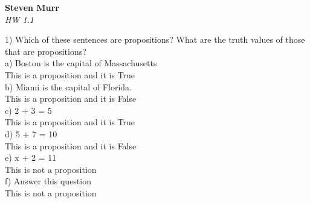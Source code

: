 \documentclass{article}
\begin{document}
   \begin{flushright}
      \Large\textbf{Steven Murr}\\
      \large\textit{HW 1.1}
   \end{flushright}
\begin{flushleft}
1) Which of these sentences are propositions? What are the truth values of those that are propositions?\newline
\\\setlength\parindent{24pt}a) Boston is the capital of Massachusetts \\
\setlength\parindent{48pt} This is a proposition and it is True \\
\setlength\parindent{0pt}
\setlength\parindent{24pt}b) Miami is the capital of Florida. \\
\setlength\parindent{48pt} This is a proposition and it is False \\
\setlength\parindent{0pt} 
\setlength\parindent{24pt}c) 2 + 3 = 5 \\
\setlength\parindent{48pt} This is a proposition and it is True \\
\setlength\parindent{0pt}
\setlength\parindent{24pt}d) 5 + 7 = 10 \\
\setlength\parindent{48pt} This is a proposition and it is False \\
\setlength\parindent{0pt}
\setlength\parindent{24pt}e) x + 2 = 11 \\ 
\setlength\parindent{48pt} This is not a proposition \\ 
\setlength\parindent{0pt}
\setlength\parindent{24pt}f) Answer this question \\
\setlength\parindent{48pt} This is not a proposition \\ 
\setlength\parindent{0pt}


\end{flushleft}
\end{document}
